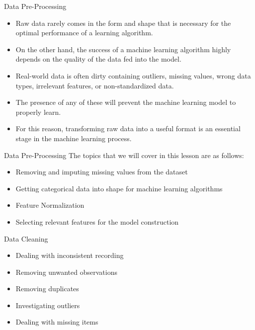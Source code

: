 \documentclass[11pt]{beamer}
\begin{document}
\begin{frame}{Data Pre-Processing}
	\begin{itemize}
		\item Raw data rarely comes in the form and shape that is necessary for the optimal performance of a learning algorithm. 
		\item On the other hand, the success of a machine learning algorithm highly depends on the quality of the data fed into the model. 
		\item Real-world data is often dirty containing outliers, missing values, wrong data types, irrelevant features, or non-standardized data. 
		\item The presence of any of these will prevent the machine learning model to properly learn. 
		\item For this reason, transforming raw data into a useful format is an essential stage in the machine learning process. 
	\end{itemize}
\end{frame}
\begin{frame}{Data Pre-Processing}
The topics that we will cover in this lesson are as follows:
\begin{itemize}
\item Removing and imputing missing values from the dataset
\item Getting categorical data into shape for machine learning algorithms
\item Feature Normalization
\item Selecting relevant features for the model construction
\end{itemize}
\end{frame}
\begin{frame}{Data Cleaning}
	\begin{itemize}
		\item Dealing with inconsistent recording
		\item Removing unwanted observations
		\item Removing duplicates
		\item Investigating outliers
		\item Dealing with missing items
	\end{itemize}
\end{frame}
\end{document}
